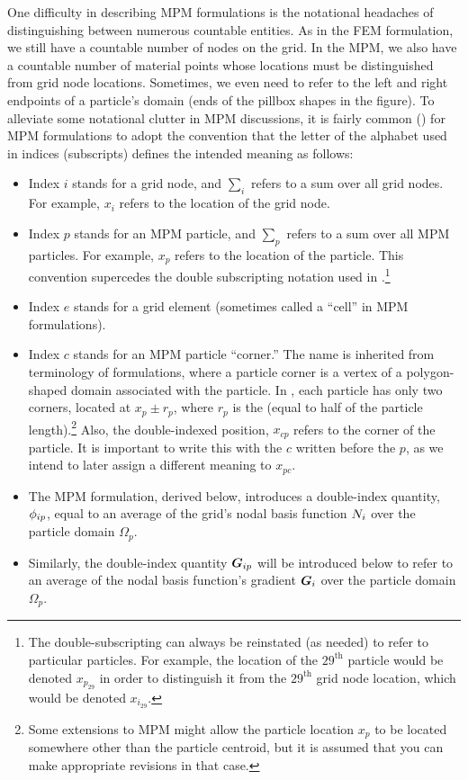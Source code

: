 One difficulty in describing MPM formulations is the notational headaches of distinguishing between numerous countable entities. As in the FEM formulation, we still have a countable number of nodes on the grid. In the MPM, we also have a countable number of material points whose locations must be distinguished from grid node locations. Sometimes, we even need to refer to the left and right endpoints of a particle's domain (ends of the pillbox shapes in the figure). To alleviate some notational clutter in MPM discussions, it is fairly common (\cf \cite{Bardenhagen2004}) for MPM formulations to adopt the convention that the letter of the alphabet used in indices (subscripts) defines the intended meaning as follows:
\begin{itemize}
  \item Index $i$ stands for a grid node, and $\sum_i$ refers to a sum over all grid nodes. For example, $x_i$ refers to the location of the \ith grid node.
  \item Index $p$ stands for an MPM particle, and $\sum_p$ refers to a sum over all MPM particles.  For example, $x_p$ refers to the location of the \pth particle. This convention supercedes the double subscripting notation used in .\footnote{The double-subscripting can always be reinstated (as needed) to refer to particular particles. For example, the location of the $29^\text{th}$ particle would be denoted $x_{p_{29}}$ in order to distinguish it from the $29^\text{th}$ grid node location, which would be denoted $x_{i_{29}}$.}
  \item Index $e$ stands for a grid element (sometimes called a ``cell'' in MPM formulations).
  \item Index $c$ stands for an MPM particle ``corner.''  The name  is inherited from terminology of \twoD formulations, where a particle corner is a vertex of a polygon-shaped domain associated with the particle. In \oneD, each particle has only two corners, located at $x_p\pm r_p$, where $r_p$ is the  (equal to half of the particle length).\footnote{Some extensions to MPM might allow the particle location $x_p$ to be located somewhere other than the particle centroid, but it is assumed that you can make appropriate revisions in that case.} Also, the double-indexed position, $x_{cp}$ refers to the \cth corner of the \pth particle.  It is important to write this with the $c$ written before the $p$, as we intend to later assign a different meaning to $x_{pc}$.
  \item The MPM formulation, derived below, introduces a double-index quantity, ${\phi_{ip}}$, equal to an average of the grid's \ith nodal basis function ${N}_i$ over the \pth particle domain $\Omega_p$.
  \item Similarly, the double-index quantity ${\bm{G}_{ip}}$ will be introduced below to refer to an average of the \ith nodal basis function's gradient $\bm{G}_i$ over the \pth particle domain $\Omega_p$.
\end{itemize}

